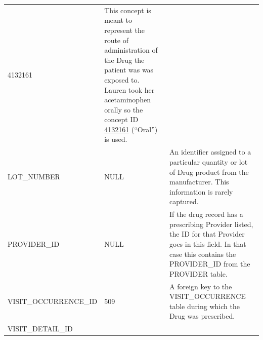 \documentclass[11pt]{book}
\theoremstyle{definition}
\theoremstyle{definition}
\theoremstyle{definition}
\theoremstyle{remark}
\begin{document}
\begin{longtable}[]{@{}lll@{}}
\begin{minipage}[t]{0.15\columnwidth}
4132161\strut
\end{minipage} & \begin{minipage}[t]{0.49\columnwidth}\raggedright
This concept is meant to represent the route of administration of the Drug the patient was was exposed to. Lauren took her acetaminophen orally so the concept ID \href{http://athena.ohdsi.org/search-terms/terms/4132161}{4132161} (``Oral'') is used.\strut
\end{minipage}\tabularnewline
\begin{minipage}[t]{0.28\columnwidth}\raggedright
LOT\_NUMBER\strut
\end{minipage} & \begin{minipage}[t]{0.15\columnwidth}\raggedright
NULL\strut
\end{minipage} & \begin{minipage}[t]{0.49\columnwidth}\raggedright
An identifier assigned to a particular quantity or lot of Drug product from the manufacturer. This information is rarely captured.\strut
\end{minipage}\tabularnewline
\begin{minipage}[t]{0.28\columnwidth}\raggedright
PROVIDER\_ID\strut
\end{minipage} & \begin{minipage}[t]{0.15\columnwidth}\raggedright
NULL\strut
\end{minipage} & \begin{minipage}[t]{0.49\columnwidth}\raggedright
If the drug record has a prescribing Provider listed, the ID for that Provider goes in this field. In that case this contains the PROVIDER\_ID from the PROVIDER table.\strut
\end{minipage}\tabularnewline
\begin{minipage}[t]{0.28\columnwidth}\raggedright
VISIT\_OCCURRENCE\_ID\strut
\end{minipage} & \begin{minipage}[t]{0.15\columnwidth}\raggedright
509\strut
\end{minipage} & \begin{minipage}[t]{0.49\columnwidth}\raggedright
A foreign key to the VISIT\_OCCURRENCE table during which the Drug was prescribed.\strut
\end{minipage}\tabularnewline
\begin{minipage}[t]{0.28\columnwidth}\raggedright
VISIT\_DETAIL\_ID\strut
\end{minipage} & \begin{minipage}[t]{0.15\columnwidth}\raggedright

\end{minipage}
\end{longtable}
\end{document}
